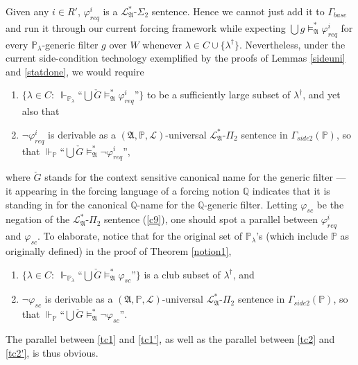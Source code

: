 \documentclass[12pt, twoside]{memoir}
\numberwithin{equation}{section}
\theoremstyle{definition}
\theoremstyle{remark}
\theoremstyle{definition}
\theoremstyle{definition}
\theoremstyle{definition}
\theoremstyle{remark}
\begin{document}
Given any $i \in R'$, $\varphi^i_{req}$ is a $\mathcal{L}^{*}_{\mathfrak{A}}$-$\Sigma_2$ sentence. Hence we cannot just add it to $\Gamma_{base}$ and run it through our current forcing framework while expecting $\bigcup g \models^{*}_{\mathfrak{A}} \varphi^i_{req}$ for every $\mathbb{P}_{\lambda}$-generic filter $g$ over $W$ whenever $\lambda \in C \cup \{\lambda^{\dagger}\}$. Nevertheless, under the current side-condition technology exemplified by the proofs of Lemmas \ref{sideuni} and \ref{statdone}, we would require 
\begin{enumerate}[label=(TC\arabic*), leftmargin=50pt]
    \item\label{tc1} $\{\lambda \in C : \ \Vdash_{\mathbb{P}_{\lambda}} \text{``} \bigcup \check{G} \models^{*}_{\mathfrak{A}} \varphi^i_{req} \text{''}\}$
    to be a sufficiently large subset of $\lambda^{\dagger}$, and yet also that
    \item\label{tc2} $\neg\varphi^i_{req}$ is derivable as a $(\mathfrak{A}, \mathbb{P}, \mathcal{L})$-universal $\mathcal{L}^*_{\mathfrak{A}}$-$\Pi_2$ sentence in $\Gamma_{side2}(\mathbb{P})$, so that $\Vdash_{\mathbb{P}} \text{``} \bigcup \check{G} \models^{*}_{\mathfrak{A}} \neg\varphi^i_{req} \text{''}$,
\end{enumerate}
where $\check{G}$ stands for the context sensitive canonical name for the generic filter --- it appearing in the forcing language of a forcing notion $\mathbb{Q}$ indicates that it is standing in for the canonical $\mathbb{Q}$-name for the $\mathbb{Q}$-generic filter. Letting $\varphi_{sc}$ be the negation of the $\mathcal{L}^*_{\mathfrak{A}}$-$\Pi_2$ sentence (\ref{c9}), one should spot a parallel between $\varphi^i_{req}$ and $\varphi_{sc}$. To elaborate, notice that for the original set of $\mathbb{P}_{\lambda}$'s (which include $\mathbb{P}$ as originally defined) in the proof of Theorem \ref{notion1},
\begin{enumerate}[label=(TC\arabic*'), leftmargin=50pt]
    \item\label{tc1'} $\{\lambda \in C : \ \Vdash_{\mathbb{P}_{\lambda}} \text{``} \bigcup \check{G} \models^{*}_{\mathfrak{A}} \varphi_{sc} \text{''}\}$
    is a club subset of $\lambda^{\dagger}$, and
    \item\label{tc2'} $\neg\varphi_{sc}$ is derivable as a $(\mathfrak{A}, \mathbb{P}, \mathcal{L})$-universal $\mathcal{L}^*_{\mathfrak{A}}$-$\Pi_2$ sentence in $\Gamma_{side2}(\mathbb{P})$, so that $\Vdash_{\mathbb{P}} \text{``} \bigcup \check{G} \models^{*}_{\mathfrak{A}} \neg\varphi_{sc} \text{''}$.
\end{enumerate}
The parallel between \ref{tc1} and \ref{tc1'}, as well as the parallel between \ref{tc2} and \ref{tc2'}, is thus obvious. 
\end{document}
